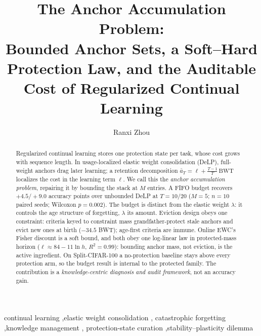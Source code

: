 \documentclass[review,12pt,number]{elsarticle}
\newcommand{\delp}{DeLP}
\begin{document}
\linenumbers

\begin{frontmatter}

\title{The Anchor Accumulation Problem:\\Bounded Anchor Sets, a Soft--Hard
Protection Law, and the Auditable Cost of Regularized Continual Learning}

\author[hnucm]{Ranxi Zhou}
\address[hnucm]{Hunan University of Chinese Medicine, 300 Xueshi Avenue,
Hanpu, Yuelu District, Changsha 410208, Hunan, China}

\begin{abstract}
Regularized continual learning stores one protection state per task,
whose cost grows with sequence length. In usage-localized elastic weight
consolidation (\delp{}), full-weight anchors drag later learning; a
retention decomposition $\bar a_T = \ell + \frac{T-1}{T}\,\mathrm{BWT}$
localizes the cost in the learning term $\ell$. We call this the
\emph{anchor accumulation problem}, repairing it by bounding the stack at
$M$ entries. A FIFO budget recovers $+4.5/+9.0$ accuracy points over
unbounded \delp{} at $T{=}10/20$ ($M{=}5$; $n{=}10$ paired seeds;
Wilcoxon $p{=}0.002$). The budget is distinct from the elastic weight
$\lambda$: it controls the age structure of forgetting, $\lambda$ its
amount. Eviction design obeys one constraint: criteria keyed to constraint
mass grandfather-protect stale anchors and evict new ones at birth
($-34.5$ BWT); age-first criteria are immune. Online EWC's Fisher discount
is a soft bound, and both obey one log-linear law in protected-mass horizon
($\ell \approx 84 - 11\ln h$, $R^2{=}0.99$): bounding anchor mass, not
eviction, is the active ingredient. On Split-CIFAR-100 a no-protection
baseline stays above every protection arm, so the budget result is internal
to the protected family. The contribution is a
\emph{knowledge-centric diagnosis and audit framework}, not an accuracy
gain.
\end{abstract}

\begin{keyword}
continual learning \sep elastic weight consolidation \sep
catastrophic forgetting \sep knowledge management \sep
protection-state curation \sep stability--plasticity dilemma
\end{keyword}

\end{frontmatter}

\end{document}
